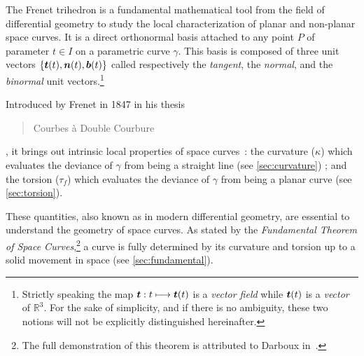 
The Frenet trihedron is a fundamental mathematical tool from the field of differential geometry to study the local characterization of planar and non-planar space curves. It is a direct orthonormal basis attached to any point $P$ of parameter $t \in I$ on a parametric curve $\gamma$. This basis is composed of three unit vectors $\{\boldsymbol{t}(t),\boldsymbol{n}(t),\boldsymbol{b}(t)\}$ called respectively the \emph{tangent}, the \emph{normal}, and the \emph{binormal} unit vectors.\footnote{
Strictly speaking the map $\boldsymbol{t} : t \longmapsto \boldsymbol{t}(t)$ is a \emph{vector field} while $\boldsymbol{t}(t)$ is a \emph{vector} of $\mathbb{R}^3$. For the sake of simplicity, and if there is no ambiguity, these two notions will not be explicitly distinguished hereinafter.}

Introduced by Frenet in 1847 in his thesis \blockcquote[]{Frenet1852}{Courbes à Double Courbure}, it brings out intrinsic local properties of space curves~: the curvature ($\kappa$) which evaluates the deviance of $\gamma$ from being a straight line (see \cref{sec:curvature}) ; and the torsion ($\tau_f$) which evaluates the deviance of $\gamma$ from being a planar curve (see \cref{sec:torsion}).

These quantities, also known as  in modern differential geometry, are essential to understand the geometry of space curves. As stated by the \emph{Fundamental Theorem of Space Curves},\footnote{The full demonstration of this theorem is attributed to Darboux in~\cite[p.11]{Delcourt2007}.} a curve is fully determined by its curvature and torsion up to a solid movement in space (see \cref{sec:fundamental}).

